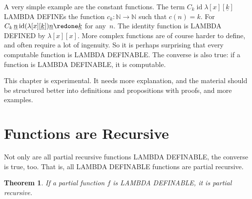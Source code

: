 \documentclass[10pt,a4paper]{article}
\newcommand*{\olup}[1]{\MakeUppercase{#1}}
\theoremstyle{plain}
\newtheorem{thm}{Theorem}[section]
\theoremstyle{definition}
\theoremstyle{remark}
\newenvironment{editorial}{}{}
\newcommand*{\olfileid}[3]{}
\newcommand*{\olsection}[1]{\section*{#1}}
\newcommand*{\olchapter}[3]{}
\newcommand*{\olimport}[1]{}
\newcommand*{\ollabel}[1]{\label{#1}}
\providecommand{\num}[1]{\underline{#1}}
\providecommand{\Nat}{\ensuremath{\mathbb{N}}}
\providecommand{\lambd}{\ensuremath{\lambda}}
\providecommand{\ident}{\operatorname{id}}
\begin{document}
A very simple example are the constant functions. The term $C_k \ident
\lambd[x][\num{k}]$ \olup{lambda define}s the function $c_k\colon \Nat \to
\Nat$ such that $c(n) = k$. For $C_k \, \num n \ident
(\lambd[x][\num{k}])\num n \redone \num{k}$ for any~$n$. The identity
function is \olup{lambda defined} by $\lambd[x][x]$. More complex
functions are of course harder to define, and often require a lot of
ingenuity. So it is perhaps surprising that every computable function
is \olup{lambda definable}. The converse is also true: if a function is
\olup{lambda definable}, it is computable.





\olchapter{lam}{rep}{Lambda Definability}

\begin{editorial}
  This chapter is experimental. It needs more explanation, and the
  material should be structured better into definitions and
  propositions with proofs, and more examples.
\end{editorial}

\olimport{introduction}
\olimport{arithmetical-functions}
\olimport{pairs}
\olimport{truth-values}
\olimport{primitive-recursive-functions}
\olimport{fixpoints}
\olimport{minimization}
\olimport{partial-recursive-functions}
\olimport{lambda-definable-recursive}

\OLEndChapterHook





\olfileid{lam}{dfl}{ldr}
\olsection{ Functions are Recursive}

Not only are all partial recursive functions \olup{lambda definable}, the
converse is true, too. That is, all \olup{lambda definable} functions are
partial recursive.

\begin{thm}
  \ollabel{thm:lambda-computable} If a partial function $f$ is
  \olup{lambda definable}, it is partial recursive.
\end{thm}
\end{document}
